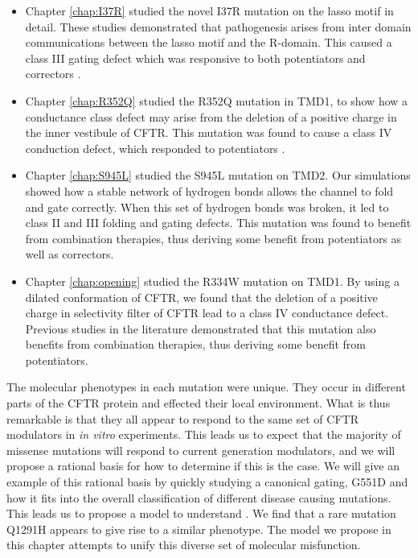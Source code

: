 \begin{itemize}
	\item Chapter \ref{chap:I37R} studied the novel I37R mutation on the lasso motif in detail. These studies demonstrated that pathogenesis arises from inter domain communications between the lasso motif and the R-domain.  This caused a class III gating defect which was responsive to both potentiators and correctors \cite{wong2022}. 
	\item Chapter \ref{chap:R352Q} studied the R352Q mutation in TMD1, to show how a conductance class defect may arise from the deletion of a positive charge in the inner vestibule of CFTR. This mutation was found to cause a class IV conduction defect, which responded to potentiators \cite{wong2022a}.
\item Chapter \ref{chap:S945L} studied the S945L mutation on TMD2. Our simulations showed how a stable network of hydrogen bonds allows the channel to fold and gate correctly. When this set of hydrogen bonds was broken, it led to class II and III folding and gating defects. This mutation was found to benefit from combination therapies, thus deriving some benefit from potentiators as well as correctors.  
\item Chapter \ref{chap:opening} studied the R334W mutation on TMD1. By using a dilated conformation of CFTR, we found that the deletion of a positive charge in selectivity filter of CFTR lead to a class IV conductance defect. Previous studies in the literature demonstrated that this mutation also benefits from combination therapies, thus deriving some benefit from potentiators. 
\end{itemize}

The molecular phenotypes in each mutation were unique. They occur in different parts of the CFTR protein and effected their local environment. What is thus remarkable is that they all appear to respond to the same set of CFTR modulators in \textit{in vitro} experiments. This leads us to expect that the majority of missense mutations will respond to current generation modulators, and we will propose a rational basis for how to determine if this is the case. We will give an example of this rational basis by quickly studying a canonical gating, G551D and how it fits into the overall classification of different disease causing mutations. This leads us to propose a model to understand . We find that a rare mutation Q1291H appears to give rise to a similar phenotype. The model we propose in this chapter attempts to unify this diverse set of molecular misfunction.

